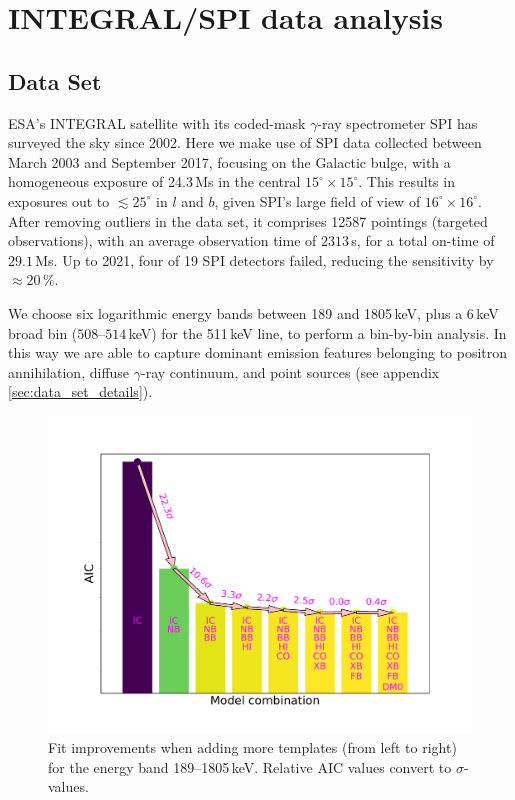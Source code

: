 \documentclass[doublespace,draft,nopageskip]{VTthesis} %
\begin{document}
	
	
	
	\section{INTEGRAL/SPI data analysis}\label{sec:data_analysis}
	\subsection{Data Set}\label{sec:data_set}
	ESA's INTEGRAL satellite \citep{Winkler2003_INTEGRAL} with its coded-mask $\gamma$-ray spectrometer SPI \citep{Vedrenne2003_SPI} has surveyed the sky since 2002. 
	Here we make use of SPI data collected between March 2003 and September 2017, focusing on the Galactic bulge, with a homogeneous exposure of 24.3\,Ms in the central $15^{\circ} \times 15^{\circ}$.
	This results in exposures out to $\lesssim 25^{\circ}$ in $l$ and $b$, given SPI's large field of view of $16^{\circ} \times 16^{\circ}$. 
	After removing outliers in the data set, it comprises 12587 pointings (targeted observations), with an average observation time of $2313$\,s, for a total on-time of $29.1$\,Ms.
	Up to 2021, four of 19 SPI detectors failed, reducing the sensitivity by $\approx 20\,\%$.
	
	
	We choose six logarithmic energy bands between 189 and 1805\,keV, plus a 6\,keV broad bin ($508$--$514$\,keV) for the 511\,keV line, to perform a bin-by-bin analysis.
	In this way we are able to capture dominant emission features belonging to positron annihilation, diffuse $\gamma$-ray continuum, and point sources (see appendix\,\ref{sec:data_set_details}).
	
	\begin{figure}
		\centering
		\includegraphics[width=0.8\columnwidth,trim=0.10in 0.7in 0.94in 0.83in,clip=true]{Figures/511keV/bar_plot_aic_spec_new2.pdf}%
		\caption{Fit improvements when adding more templates (from left to right) for the energy band 189--1805\,keV. Relative AIC values convert to $\sigma$-values.}
		\label{fig:model_improvement_all_models}%
	\end{figure}
	
\end{document}
